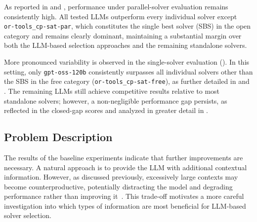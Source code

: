 \documentclass[../../main]{subfiles}
\begin{document}
\begin{table}[!ht]
    \centering
    \caption{Tests on sanitized scripts given to the 5 best performing LLMs, columns content is calculated as in .}
    \label{tab:combinedBase}
\end{table}

As reported in  and , performance under parallel-solver evaluation remains consistently high. All tested LLMs outperform every individual solver except \\\texttt{or-tools\_cp-sat-par}, which constitutes the single best solver (SBS) in the open category and remains clearly dominant, maintaining a substantial margin over both the LLM-based selection approaches and the remaining standalone solvers.

More pronounced variability is observed in the single-solver evaluation (). In this setting, only \texttt{gpt-oss-120b} consistently surpasses all individual solvers other than the SBS in the free category (\texttt{or-tools\_cp-sat-free}), as further detailed in  and . The remaining LLMs still achieve competitive results relative to most standalone solvers; however, a non-negligible performance gap persists, as reflected in the closed-gap scores and analyzed in greater detail in .

\subsection{Problem Description}
The results of the baseline experiments indicate that further improvements are necessary. A natural approach is to provide the LLM with additional contextual information. However, as discussed previously, excessively large contexts may become counterproductive, potentially distracting the model and degrading performance rather than improving it~\cite{ContextRot,LLMdistract}. This trade-off motivates a more careful investigation into which types of information are most beneficial for LLM-based solver selection.
\end{document}
